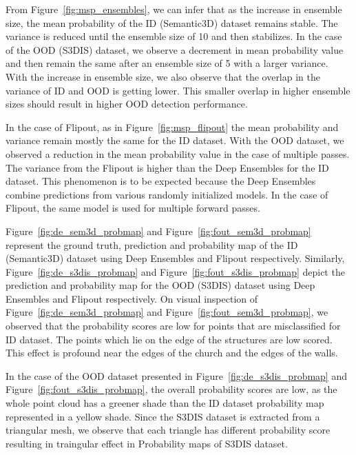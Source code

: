     From Figure~\ref{fig:msp_ensembles}, we can infer that as the increase in ensemble size, the mean probability of the ID (Semantic3D) dataset remains stable.
    The variance is reduced until the ensemble size of 10 and then stabilizes.
    In the case of the OOD (S3DIS) dataset, we observe a decrement in mean probability value and then remain the same after an ensemble size of 5 with a larger variance.
    With the increase in ensemble size, we also observe that the overlap in the variance of ID and OOD is getting lower.
    This smaller overlap in higher ensemble sizes should result in higher OOD detection performance.
    
    In the case of Flipout, as in Figure~\ref{fig:msp_flipout} the mean probability and variance remain mostly the same for the ID dataset.
    With the OOD dataset, we observed a reduction in the mean probability value in the case of multiple passes.
    The variance from the Flipout is higher than the Deep Ensembles for the ID dataset.
    This phenomenon is to be expected because the Deep Ensembles combine predictions from various randomly initialized models.
    In the case of Flipout, the same model is used for multiple forward passes.

    Figure~\ref{fig:de_sem3d_probmap} and Figure~\ref{fig:fout_sem3d_probmap} represent the ground truth, prediction and probability map of the ID (Semantic3D) dataset using Deep Ensembles and Flipout respectively.
    Similarly, Figure~\ref{fig:de_s3dis_probmap} and Figure~\ref{fig:fout_s3dis_probmap} depict the prediction and probability map for the OOD (S3DIS) dataset using Deep Ensembles and Flipout respectively.
    On visual inspection of Figure~\ref{fig:de_sem3d_probmap} and Figure~\ref{fig:fout_sem3d_probmap}, we observed that the probability scores are low for points that are misclassified for ID dataset.
    The points which lie on the edge of the structures are low scored.
    This effect is profound near the edges of the church and the edges of the walls.
    
    In the case of the OOD dataset presented in Figure~\ref{fig:de_s3dis_probmap} and Figure~\ref{fig:fout_s3dis_probmap}, the overall probability scores are low, as the whole point cloud has a greener shade than the ID dataset probability map represented in a yellow shade.
    Since the S3DIS dataset is extracted from a triangular mesh, we observe that each triangle has different probability score resulting in traingular effect in Probability maps of S3DIS dataset.

